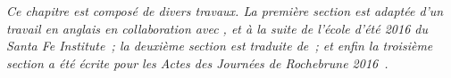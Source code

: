 \stars


\textit{Ce chapitre est composé de divers travaux. La première section est adaptée d'un travail en anglais en collaboration avec ,  et  à la suite de l'école d'été 2016 du Santa Fe Institute~\cite{antelope2016interdisciplinary}; la deuxième section est traduite de~\cite{}; et enfin la troisième section a été écrite pour les Actes des Journées de Rochebrune 2016~\cite{raimbault2016generation}.}














